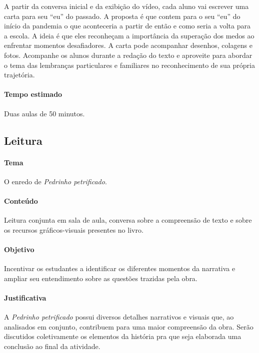 \documentclass[11pt]{extarticle}
\begin{document}
A partir da conversa inicial e da exibição do vídeo, cada aluno vai escrever uma carta para seu ``eu'' do passado. A proposta é que contem para o seu ``eu'' do início da pandemia o que aconteceria a partir de então e como seria a volta para a escola. A ideia é que eles reconheçam a importância da superação dos medos ao enfrentar momentos desafiadores. A carta pode acompanhar desenhos, colagens e fotos. Acompanhe os alunos durante a redação do texto e aproveite para abordar o tema das lembranças particulares e familiares no reconhecimento de sua própria trajetória.

\paragraph{Tempo estimado} Duas aulas de 50 minutos.

\subsection{Leitura}


\paragraph{Tema} O enredo de \textit{Pedrinho petrificado}.

\paragraph{Conteúdo} Leitura conjunta em sala de aula, conversa sobre a compreensão de texto e sobre os recursos gráficos-visuais presentes no livro.

\paragraph{Objetivo} Incentivar os estudantes a identificar os diferentes momentos da narrativa e ampliar seu entendimento sobre as questões trazidas pela obra.

\paragraph{Justificativa} A \textit{Pedrinho petrificado} possui diversos detalhes narrativos e visuais que, ao analisados em conjunto, contribuem para uma maior compreensão da obra. Serão discutidos coletivamente os elementos da história pra que seja elaborada uma conclusão ao final da atividade.
\end{document}
